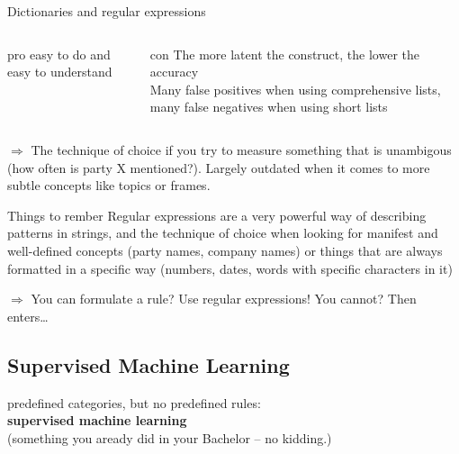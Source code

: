 \documentclass{beamer}
\begin{document}
\begin{frame}{Dictionaries and regular expressions}
	
	
	\begin{columns}[t]
		\begin{exampleblock}{pro}
			easy to do and easy to understand
		\end{exampleblock}
		\begin{alertblock}{con}
		The more latent the construct, the lower the accuracy\\
		Many false positives when using comprehensive lists, many false negatives when using short lists
		\end{alertblock}
	\end{columns}
	
	
	$\Rightarrow$ The technique of choice if you try to measure something that is unambigous (how often is party X mentioned?). Largely outdated when it comes to more subtle concepts like topics or frames.
	
\end{frame}




\begin{frame}[plain]
	\begin{alertblock}{Things to rember}
		Regular expressions are a very powerful way of describing patterns in strings, and the technique of choice when looking for manifest and well-defined concepts (party names, company names) or things that are always formatted in a specific way (numbers, dates, words with specific characters in it)
	\end{alertblock}
$\Rightarrow$ You can formulate a rule? Use regular expressions! You cannot? Then enters\ldots	
\end{frame}





\subsection[Supervised Machine Learning]{Supervised Machine Learning}

\begin{frame}[plain]
	predefined categories, but no predefined rules:\\ \textbf{supervised machine learning}\\
	\vspace{1cm}\hspace{1cm} \onslide<2> \footnotesize{(something you aready did in your Bachelor -- no kidding.)}
\end{frame}
\end{document}
